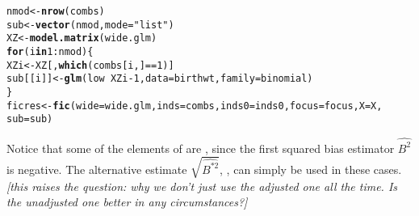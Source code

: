 \documentclass[article,shortnames,nojss,nofooter]{jss}\usepackage[]{graphicx}\usepackage[]{color}
\makeatletter
\newcommand{\hlnum}[1]{\textcolor[rgb]{0.686,0.059,0.569}{#1}}%
\newcommand{\hlstr}[1]{\textcolor[rgb]{0.192,0.494,0.8}{#1}}%
\newcommand{\hlopt}[1]{\textcolor[rgb]{0,0,0}{#1}}%
\newcommand{\hlstd}[1]{\textcolor[rgb]{0.345,0.345,0.345}{#1}}%
\newcommand{\hlkwa}[1]{\textcolor[rgb]{0.161,0.373,0.58}{\textbf{#1}}}%
\newcommand{\hlkwb}[1]{\textcolor[rgb]{0.69,0.353,0.396}{#1}}%
\newcommand{\hlkwc}[1]{\textcolor[rgb]{0.333,0.667,0.333}{#1}}%
\newcommand{\hlkwd}[1]{\textcolor[rgb]{0.737,0.353,0.396}{\textbf{#1}}}%
\newenvironment{kframe}{%
 \def\at@end@of@kframe{}%
 \ifinner\ifhmode%
  \def\at@end@of@kframe{\end{minipage}}%
  \begin{minipage}{\columnwidth}%
 \fi\fi%
 \def\FrameCommand##1{\hskip\@totalleftmargin \hskip-\fboxsep
 \colorbox{shadecolor}{##1}\hskip-\fboxsep
     \hskip-\linewidth \hskip-\@totalleftmargin \hskip\columnwidth}%
 \MakeFramed {\advance\hsize-\width
   \@totalleftmargin\z@ \linewidth\hsize
   \@setminipage}}%
 {\par\unskip\endMakeFramed%
 \at@end@of@kframe}
\newenvironment{knitrout}{}{} %
\makeatother
\begin{document}
\begin{knitrout}
\color{fgcolor}\begin{kframe}
\begin{alltt}
\hlstd{nmod} \hlkwb{<-} \hlkwd{nrow}\hlstd{(combs)}
\hlstd{sub} \hlkwb{<-} \hlkwd{vector}\hlstd{(nmod,} \hlkwc{mode}\hlstd{=}\hlstr{"list"}\hlstd{)}
\hlstd{XZ} \hlkwb{<-} \hlkwd{model.matrix}\hlstd{(wide.glm)}
\hlkwa{for} \hlstd{(i} \hlkwa{in} \hlnum{1}\hlopt{:}\hlstd{nmod)\{}
  \hlstd{XZi} \hlkwb{<-} \hlstd{XZ[,}\hlkwd{which}\hlstd{(combs[i,]}\hlopt{==}\hlnum{1}\hlstd{)]}
  \hlstd{sub[[i]]} \hlkwb{<-} \hlkwd{glm}\hlstd{(low} \hlopt{~} \hlstd{XZi} \hlopt{-} \hlnum{1}\hlstd{,} \hlkwc{data}\hlstd{=birthwt,} \hlkwc{family}\hlstd{=binomial)}
\hlstd{\}}
\hlstd{ficres} \hlkwb{<-} \hlkwd{fic}\hlstd{(}\hlkwc{wide}\hlstd{=wide.glm,} \hlkwc{inds}\hlstd{=combs,} \hlkwc{inds0}\hlstd{=inds0,} \hlkwc{focus}\hlstd{=focus,} \hlkwc{X}\hlstd{=X,}
              \hlkwc{sub}\hlstd{=sub)}
\end{alltt}
\end{kframe}
\end{knitrout}

Notice that some of the  elements of  are
, since the first squared bias estimator $\widehat{B^2}$ is
negative.  The alternative estimate $\sqrt{\widehat{B^{*2}}}$,
, can simply be used in these cases.  
\emph{[this raises the question: why we
  don't just use the adjusted one all the time.  Is the unadjusted one
  better in any circumstances?]}
\end{document}
